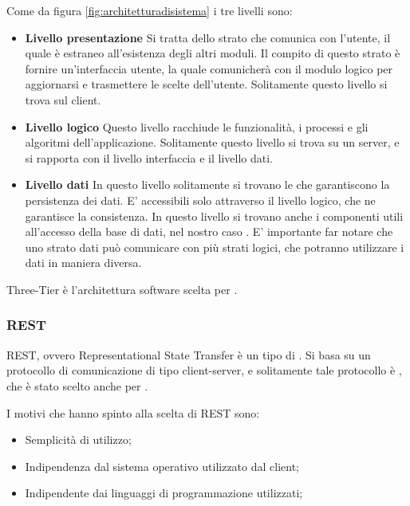 Come da figura \ref{fig:architetturadisistema} i tre livelli sono:
\begin{itemize}
\item \textbf{Livello presentazione} Si tratta dello strato che comunica con l'utente, il quale è estraneo all'esistenza degli altri moduli. Il compito di questo strato è fornire un'interfaccia utente, la quale comunicherà con il modulo logico per aggiornarsi e trasmettere le scelte dell'utente. Solitamente questo livello si trova sul client.
\item \textbf{Livello logico} Questo livello racchiude le funzionalità, i processi e gli algoritmi dell'applicazione. Solitamente questo livello si trova su un server, e si rapporta con il livello interfaccia e il livello dati. 
\item \textbf{Livello dati} In questo livello solitamente si trovano le  che garantiscono la persistenza dei dati. E' accessibili solo attraverso il livello logico, che ne garantisce la consistenza. In questo livello si trovano anche i componenti utili all'accesso della base di dati, nel nostro caso .
E' importante far notare che uno strato dati può comunicare con più strati logici, che potranno utilizzare i dati in maniera diversa.
\end{itemize}

Three-Tier è l'architettura software scelta per \ProjectName.

\subsubsection{REST}

REST, ovvero Representational State Transfer è un tipo di . Si basa su un protocollo di comunicazione  di tipo client-server, e solitamente tale protocollo è , che è stato scelto anche per \ProjectName.

I motivi che hanno spinto alla scelta di REST sono:
\begin{itemize}
\item Semplicità di utilizzo;
\item Indipendenza dal sistema operativo utilizzato dal client;
\item Indipendente dai linguaggi di programmazione utilizzati;
\end{itemize}

